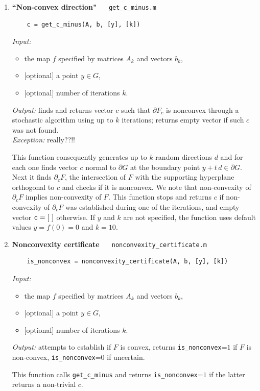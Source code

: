 \documentclass[a4paper]{article}
\theoremstyle{definition}
\begin{document}
\begin{enumerate}
\item {\bf ``Non-convex direction"\ \ \  }{\tt get\_c\_minus.m} 
	\begin{verbatim}
	c = get_c_minus(A, b, [y], [k])
	\end{verbatim}
{\it Input:}
\begin{itemize}
	\item the map $f$ specified by matrices $A_k$ and vectors $b_k$,
	\item  $[$optional$]$ a point $y\in G$,
	\item $[$optional$]$ number of iterations $k$.
\end{itemize}
{\it Output:}  finds and returns vector $c$ such that $\partial F_c$ is nonconvex through a stochastic algorithm using up to $k$ iterations; returns empty vector if such $c$ was not  found.\\
{\it Exception:} really??!!

	This function consequently generates up to $k$ random directions $d$ and for each one finds vector $c$ normal to $\partial G$ at the boundary point $y+t\, d\in \partial G$.  Next it finds $\partial_c F$, the intersection of $F$ with the supporting hyperplane orthogonal to $c$ and checks if it is nonconvex.  We note that non-convexity of $\partial_c F$ implies non-convexity of $F$. This function stops and returns $c$ if non-convexity of $\partial_c F$ was established during one of the iterations, and empty vector ${\tt c=[\ ]}$ otherwise. 
If $y$ and $k$ are not specified, the function uses default values $y=f(0)=0$ and $k=10$.


\item {\bf Nonconvexity certificate\ \ \  }{\tt nonconvexity\_certificate.m} 
	\begin{verbatim}
	is_nonconvex = nonconvexity_certificate(A, b, [y], [k])
	\end{verbatim}
{\it Input:}
\begin{itemize}
	\item the map $f$ specified by matrices $A_k$ and vectors $b_k$,
	\item  $[$optional$]$ a point $y\in G$,
	\item $[$optional$]$ number of iterations $k$.
\end{itemize}
{\it Output:} attempts to establish if $F$ is convex, returns {\tt is\_nonconvex}=$1$ if $F$ is non-convex,  {\tt is\_nonconvex}=$0$ if uncertain.

	
	This function calls {\tt get\_c\_minus} and returns  {\tt is\_nonconvex}=$1$ if the latter returns a non-trivial $c$. 



\end{enumerate}
\end{document}

